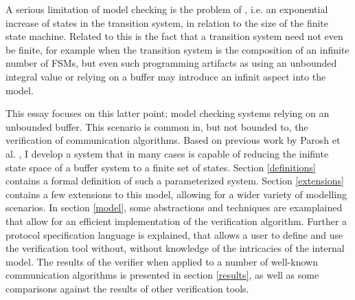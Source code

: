 A serious limitation of model checking is the problem of , i.e. an exponential increase of states in the transition system, in relation to the size of the finite state machine. Related to this is the fact that a transition system need not even be finite, for example when the transition system is the composition of an infinite number of FSMs, but even such programming artifacts as using an unbounded integral value or relying on a buffer may introduce an infinit aspect into the model.

This essay focuses on this latter point; model checking systems relying on an unbounded buffer. This scenario is common in, but not bounded to, the verification of communication algorithms. Based on previous work by Parosh et al. , I develop a system that in many cases is capable of reducing the inifinte state space of a buffer system to a finite set of states. Section \ref{definitions} contains a formal definition of such a parameterized system. Section \ref{extensions} contains a few extensions to this model, allowing for a wider variety of modelling scenarios. In section \ref{model}, some abstractions and techniques are examplained that allow for an efficient implementation of the verification algorithm. Further a protocol specification language is explained, that allows a user to define and use the verification tool without, without knowledge of the intricacies of the internal model. The results of the verifier when applied to a number of well-known communication algorithms is presented in section \ref{results}, as well as some comparisons against the results of other verification tools.

